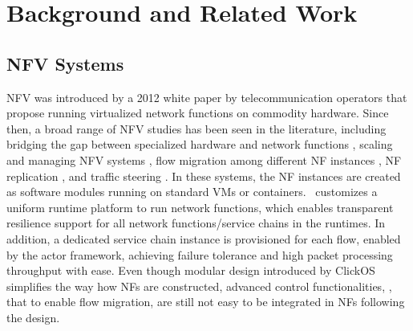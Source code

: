 \section{Background and Related Work}
\label{sec:relatedwork}



\subsection{NFV Systems}

NFV was introduced by a 2012 white paper \cite{nfv_whitepaper} by telecommunication operators that propose running virtualized network functions on commodity hardware. Since then, a broad range of NFV studies has been seen in the literature, including bridging the gap between specialized hardware and network functions \cite{hwang2015netvm, Han:EECS-2015-155, martins2014clickos, 199352}, scaling and managing NFV systems \cite{gember2012stratos, palkar2015e2}, flow migration among different NF instances \cite{rajagopalan2013split, khalid2016paving, gember2015opennf}, NF replication \cite{rajagopalan2013pico, sherry2015rollback}, and traffic steering \cite{simplifying}. %
In these systems, the NF instances are created as software modules running on standard VMs or containers. \nfactor~customizes a uniform runtime platform to run network functions, which enables transparent resilience support for all network functions/service chains in the runtimes. In addition, a dedicated service chain instance is provisioned for each flow, enabled by the actor framework, achieving failure tolerance and high packet processing throughput with ease. Even though modular design introduced by ClickOS  \cite{martins2014clickos} %
 simplifies the way how NFs are constructed, advanced control functionalities, \eg, that to enable flow migration, are still not easy to be integrated in NFs following the design. %

